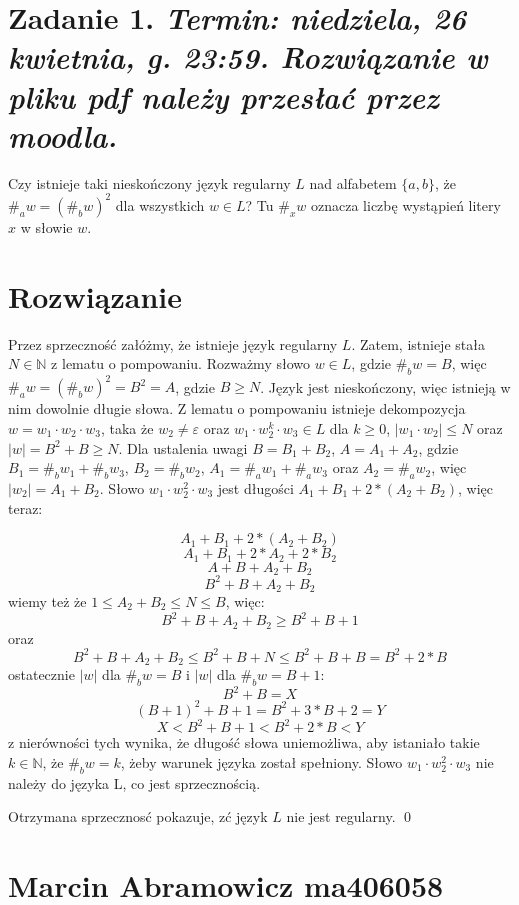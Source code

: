 \documentclass[a4paper]{article}
\renewcommand{\le}{\leqslant}%
\renewcommand{\ge}{\geqslant}%
\newcommand{\eps}{\varepsilon}%
\newcommand{\N}{\mathbb N}%
\newcommand{\set}[1]{\{#1\}}%
\begin{document}
\section*{Zadanie 1. \small{\textnormal{ \itshape Termin: niedziela, 26 kwietnia, g. 23:59.
Rozwiązanie w pliku pdf należy przesłać przez moodla.}}
}
Czy istnieje taki nieskończony język regularny $L$ nad alfabetem
$\set{a,b}$, że $\#_{a}w=(\#_{b}w)^2$ dla wszystkich $w\in L$?
Tu $\#_{x}w$ oznacza liczbę wystąpień litery $x$ w słowie $w$.


\section*{Rozwiązanie}

Przez sprzeczność załóżmy, że istnieje język regularny $L$. Zatem, istnieje stała $N\in \N$ z lematu o pompowaniu. Rozważmy słowo $w\in L$, gdzie $\#_{b}w = B$, więc $\#_{a}w=(\#_{b}w)^2 = B^2 = A$, gdzie $B \ge N$. Język jest nieskończony, więc istnieją w nim dowolnie długie słowa. Z lematu o pompowaniu istnieje dekompozycja $w = w_1 \cdot w_2 \cdot w_3$, taka że $w_2 \neq \eps$ oraz $w_1 \cdot w_2^k \cdot w_3 \in L$ dla $k \ge 0$, $|w_1 \cdot w_2| \le N$ oraz $|w| = B^2 + B \ge N$. Dla ustalenia uwagi $B = B_1 + B_2$, $A = A_1 + A_2$, gdzie $B_1 = \#_{b}w_1 + \#_{b}w_3$, $B_2 = \#_{b}w_2$, $A_1 = \#_{a}w_1 + \#_{a}w_3$ oraz $A_2 = \#_{a}w_2$, więc $|w_2| = A_1 + B_2$. Słowo $w_1 \cdot w_2^2 \cdot w_3$ jest długości $A_1 + B_1 + 2 * (A_2 + B_2)$, więc teraz:

\[A_1 + B_1 + 2 * (A_2 + B_2)\]
\[A_1 + B_1 + 2 * A_2 + 2 *B_2\] 
\[A + B + A_2 + B_2\]
\[B^2 + B + A_2 + B_2\]
wiemy też że $1 \le A_2 + B_2 \le N \le B$, więc:
\[B^2 + B + A_2 + B_2 \ge B^2 + B + 1\]
oraz
\[B^2 + B + A_2 + B_2 \le B^2 + B + N \le B^2 + B + B = B^2 + 2 * B\]
ostatecznie $|w|$ dla $\#_{b}w = B$ i $|w|$ dla $\#_{b}w = B + 1$:
\[B^2 + B = X\]
\[(B+1)^2 + B + 1 = B^2 + 3 * B + 2 = Y\]
\[X < B^2 + B + 1 < B^2 + 2 * B < Y\]
z nierówności tych wynika, że długość słowa uniemożliwa, aby istaniało takie $k \in \N$, że $\#_{b}w = k$, żeby warunek języka został spełniony. 
Słowo $w_1 \cdot w_2^2 \cdot w_3$ nie należy do języka L, co jest sprzecznością.

Otrzymana sprzecznosć pokazuje, zć język $L$ nie jest regularny.
\qed


\section*{Marcin Abramowicz ma406058}
\end{document}
